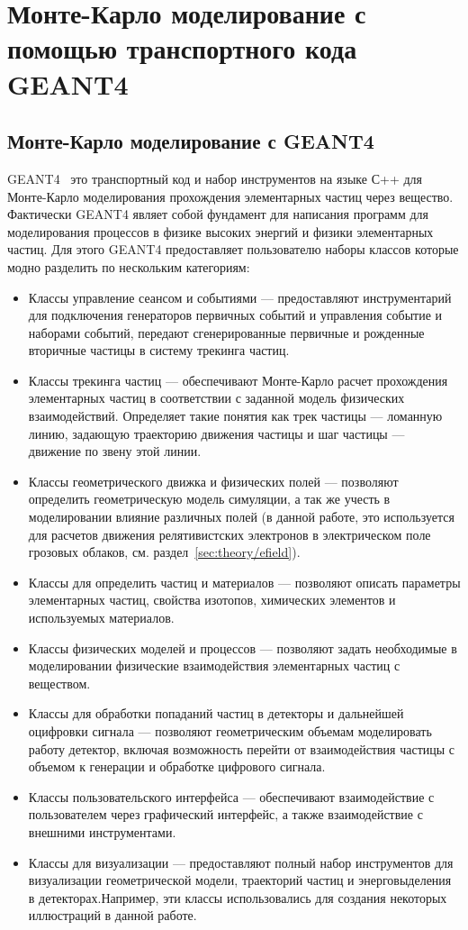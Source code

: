 \chapter{Монте-Карло моделирование с помощью транспортного кода GEANT4}\label{ch:theory}

\section{Монте-Карло моделирование с GEANT4
}\label{sec:theory/geant4}
GEANT4~\cite{Geant2006, Geant2016, Geant2003, collaboration2016physics, collaboration2012geant4} это транспортный код и набор инструментов на языке С++ для Монте-Карло моделирования прохождения элементарных частиц через вещество. Фактически GEANT4 являет собой фундамент для написания программ для моделирования процессов в физике высоких энергий и физики элементарных частиц. Для этого GEANT4 предоставляет пользователю наборы классов которые модно разделить по нескольким категориям: 
\begin{itemize}
    \item Классы управление сеансом и событиями --- предоставляют инструментарий для подключения генераторов первичных событий и управления событие и наборами событий, передают сгенерированные первичные и рожденные вторичные частицы в систему трекинга частиц.
    \item Классы трекинга частиц --- обеспечивают Монте-Карло расчет прохождения элементарных частиц в соответствии с заданной модель физических взаимодействий. Определяет такие понятия как трек частицы --- ломанную линию, задающую траекторию движения частицы и шаг частицы --- движение по звену этой линии. 
    \item Классы геометрического движка и физических полей --- позволяют определить геометрическую модель симуляции, а так же учесть в моделировании влияние различных полей (в данной работе, это используется для расчетов движения релятивистских электронов в электрическом поле грозовых облаков, см. раздел~\ref{sec:theory/efield}).
    \item Классы для определить частиц и материалов --- позволяют описать параметры элементарных частиц, свойства изотопов, химических элементов и используемых материалов.
    \item Классы физических моделей и процессов --- позволяют задать необходимые в моделировании физические взаимодействия элементарных частиц с веществом.
    \item Классы для обработки попаданий частиц в детекторы и дальнейшей оцифровки сигнала --- позволяют геометрическим объемам моделировать работу  детектор, включая возможность перейти от взаимодействия частицы с объемом к генерации и обработке цифрового сигнала.
    \item Классы пользовательского интерфейса --- обеспечивают взаимодействие с пользователем через графический интерфейс, а также взаимодействие с внешними инструментами.
    \item Классы для визуализации --- предоставляют полный набор инструментов для визуализации геометрической модели, траекторий частиц и энерговыделения в детекторах.Например, эти классы использовались для создания некоторых иллюстраций в данной работе.
\end{itemize}
